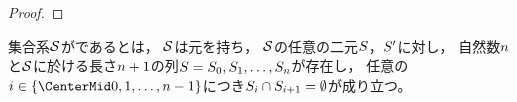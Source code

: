 \begin{proof}
\end{proof}

\begin{definition}
    集合系\( \Set<\mathcal{S}> \)が\WordChainLinked であるとは，
    \( \Set<\mathcal{S}> \)は元を持ち，
    \( \Set<\mathcal{S}> \)の任意の二元\( \Set<S> \)，\( \Set<S>' \)に対し，
    自然数\( \NaturalNumber \)と\( \Set<\mathcal{S}> \)に於ける長さ\( \NaturalNumber<n+1> \)の列\( \Set<S>=\Set<S>_0, \Set<S>_1, \ldots, \Set<S>_{\NaturalNumber} \)が存在し，
    任意の\( \NaturalNumber<i>\in\Set{0,1,\ldots,\NaturalNumber<n-1>} \)につき\( \Set<S>_{\NaturalNumber<i>}\cap\Set<S>_{\NaturalNumber<i+1>} = \emptyset \)が成り立つ。
\end{definition}

